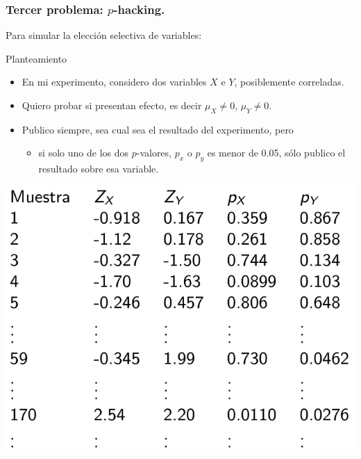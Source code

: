 \documentclass[9pt]{beamer}
\begin{document}
\begin{frame}
  \frametitle{Tercer problema: $p$-hacking.}
  Para simular la elección selectiva de variables:\\ 
  \begin{block}{Planteamiento}
    \begin{itemize}
    \item     En mi experimento, considero dos variables $X$ e $Y$,
      posiblemente correladas.
    \item Quiero probar si presentan efecto, es decir $\mu_X \neq 0$,
      $\mu_Y\neq 0$.
    \item   Publico siempre, sea cual sea el resultado del
      experimento, pero
      \begin{itemize}
      \item si solo uno de los dos $p$-valores, $p_x$ o $p_y$ es menor
        de 0.05, sólo publico el resultado sobre esa variable.
      \end{itemize}
    \end{itemize}

  \end{block}
  \begin{center}
    \includegraphics[width=0.5\linewidth]{images/select_variable-1}
  \end{center}
\end{frame}
\end{document}
